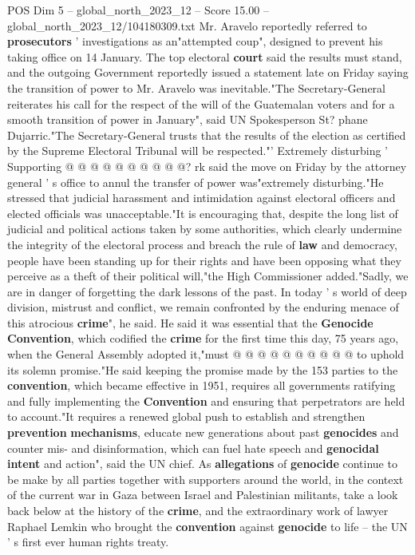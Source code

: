 \begin{textsample}{POS Dim 5 – global\_north\_2023\_12 – Score 15.00 – global\_north\_2023\_12/104180309.txt}
Mr.
Aravelo reportedly referred to \textbf{prosecutors} ' investigations as an"attempted coup", designed to prevent his taking office on 14 January.
The top electoral \textbf{court} said the results must stand, and the outgoing Government reportedly issued a statement late on Friday saying the transition of power to Mr.
Aravelo was inevitable."The Secretary-General reiterates his call for the respect of the will of the Guatemalan voters and for a smooth transition of power in January", said UN Spokesperson St? phane Dujarric."The Secretary-General trusts that the results of the election as certified by the Supreme Electoral Tribunal will be respected."' Extremely disturbing ' Supporting @ @ @ @ @ @ @ @ @ @? rk said the move on Friday by the attorney general ' s office to annul the transfer of power was"extremely disturbing."He stressed that judicial harassment and intimidation against electoral officers and elected officials was unacceptable."It is encouraging that, despite the long list of judicial and political actions taken by some authorities, which clearly undermine the integrity of the electoral process and breach the rule of \textbf{law} and democracy, people have been standing up for their rights and have been opposing what they perceive as a theft of their political will,"the High Commissioner added."Sadly, we are in danger of forgetting the dark lessons of the past.
In today ' s world of deep division, mistrust and conflict, we remain confronted by the enduring menace of this atrocious \textbf{crime}", he said.
He said it was essential that the \textbf{Genocide} \textbf{Convention}, which codified the \textbf{crime} for the first time this day, 75 years ago, when the General Assembly adopted it,"must @ @ @ @ @ @ @ @ @ @ to uphold its solemn promise."He said keeping the promise made by the 153 parties to the \textbf{convention}, which became effective in 1951, requires all governments ratifying and fully implementing the \textbf{Convention} and ensuring that perpetrators are held to account."It requires a renewed global push to establish and strengthen \textbf{prevention} \textbf{mechanisms}, educate new generations about past \textbf{genocides} and counter mis- and disinformation, which can fuel hate speech and \textbf{genocidal} \textbf{intent} and action", said the UN chief.
As \textbf{allegations} of \textbf{genocide} continue to be make by all parties together with supporters around the world, in the context of the current war in Gaza between Israel and Palestinian militants, take a look back below at the history of the \textbf{crime}, and the extraordinary work of lawyer Raphael Lemkin who brought the \textbf{convention} against \textbf{genocide} to life -- the UN ' s first ever human rights treaty.

\end{textsample}
